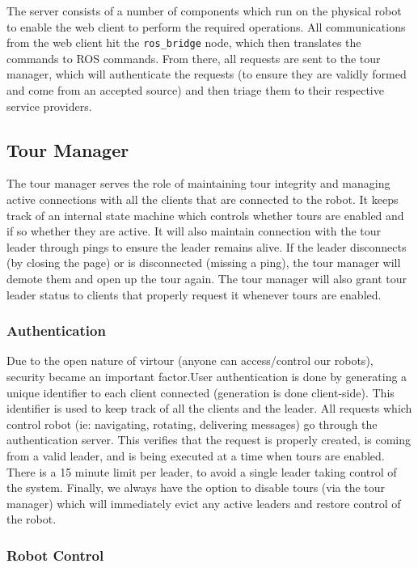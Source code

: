 \documentclass{sig-alternate-05-2015}
\begin{document}
The server consists of a number of components which run on the physical robot
to enable the web client to perform the required operations. All communications
from the web client hit the \verb|ros_bridge| node, which then translates the
commands to ROS commands. From there, all requests are sent to the tour
manager, which will authenticate the requests (to ensure they are validly
formed and come from an accepted source) and then triage them to their
respective service providers.

\subsection{Tour Manager}

The tour manager serves the role of maintaining tour integrity and managing
active connections with all the clients that are connected to the robot. It
keeps track of an internal state machine which controls whether tours are
enabled and if so whether they are active. It will also maintain connection
with the tour leader through pings to ensure the leader remains alive. If the
leader disconnects (by closing the page) or is disconnected (missing a ping),
the tour manager will demote them and open up the tour again. The tour manager
will also grant tour leader status to clients that properly request it whenever
tours are enabled.

\subsubsection{Authentication}

Due to the open nature of virtour (anyone can access/control our robots),
security became an important factor.User authentication is done by generating a
unique identifier to each client connected (generation is done client-side).
This identifier is used to keep track of all the clients and the leader. All
requests which control robot (ie: navigating, rotating, delivering messages) go
through the authentication server. This verifies that the request is properly
created, is coming from a valid leader, and is being executed at a time when
tours are enabled. There is a 15 minute limit per leader, to avoid
a single leader taking control of the system. Finally, we always have the
option to disable tours (via the tour manager) which will immediately evict any
active leaders and restore control of the robot.

\subsubsection{Robot Control}
\end{document}
